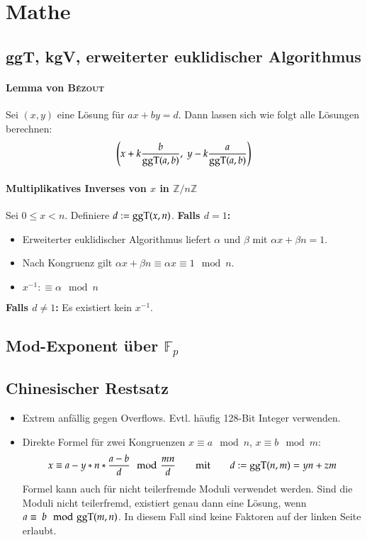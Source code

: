 \section{Mathe}

\subsection{ggT, kgV, erweiterter euklidischer Algorithmus}



\paragraph{Lemma von \textsc{Bézout}}
Sei $(x, y)$ eine Lösung für $ax + by = d$.
Dann lassen sich wie folgt alle Lösungen berechnen:
\[
	\left(x + k\frac{b}{\text{ggT}(a, b)},~y - k\frac{a}{\text{ggT}(a, b)}\right)
\]

\paragraph{Multiplikatives Inverses von $x$ in $\mathbb{Z}/n\mathbb{Z}$}
Sei $0 \leq x < n$. Definiere $d := \text{ggT}(x, n)$.\newline
\textbf{Falls $d = 1$:}
\begin{itemize}[nosep]
	\item Erweiterter euklidischer Algorithmus liefert $\alpha$ und $\beta$ mit
	$\alpha x + \beta n = 1$.
	\item Nach Kongruenz gilt $\alpha x + \beta n \equiv \alpha x \equiv 1 \mod n$.
	\item $x^{-1} :\equiv \alpha \mod n$
	\end{itemize}
\textbf{Falls $d \neq 1$:} Es existiert kein $x^{-1}$.


\subsection{Mod-Exponent über $\mathbb{F}_p$}


\subsection{Chinesischer Restsatz}
\begin{itemize}
	\item Extrem anfällig gegen Overflows. Evtl. häufig 128-Bit Integer verwenden.
	\item Direkte Formel für zwei Kongruenzen $x \equiv a \mod n$, $x \equiv b \mod m$:
	\[
		x \equiv a - y * n * \frac{a - b}{d} \mod \frac{mn}{d}
		\qquad \text{mit} \qquad
		d := \text{ggT}(n, m) = yn + zm
	\]
	Formel kann auch für nicht teilerfremde Moduli verwendet werden.
	Sind die Moduli nicht teilerfremd, existiert genau dann eine Lösung,
	wenn $a\equiv~b \mod {\text{ggT}}(m, n)$.
	In diesem Fall sind keine Faktoren
	auf der linken Seite erlaubt.
\end{itemize}


